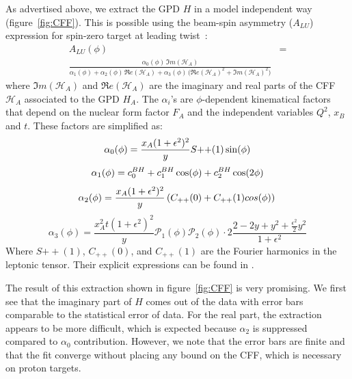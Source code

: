 \documentclass[%
 reprint,
 amsmath,amssymb,
 aps,
]{revtex4-1}
\begin{document}
As advertised above, we extract the GPD $H$ in a model independent way 
(figure~\ref{fig:CFF}). This is possible using the beam-spin asymmetry ($A_{LU}$) 
expression for spin-zero target at leading twist~\cite{BM_2009}:
\begin{equation}
\begin{split}
A_{LU}(\phi) &= \\
 \frac{\alpha_{0}(\phi) \, \Im m(\mathcal{H}_{A})}
{\alpha_{1}(\phi) + \alpha_{2}(\phi) \, \Re e(\mathcal{H}_{A}) + \alpha_{3}(\phi) \, 
\big( 
\Re e(\mathcal{H}_{A})^{2} + \Im m(\mathcal{H}_{A})^{2} \big)}
\label{eq:A_LU-coh}
\end{split}
\end{equation}
where $\Im m(\mathcal{H}_{A})$ and $\Re e(\mathcal{H}_{A})$ are the imaginary 
and real parts of the CFF $\mathcal{H}_{A}$ associated to the GPD $H_A$. The 
$\alpha_{i}$'s are $\phi$-dependent kinematical factors that depend on the 
nuclear form factor $F_A$ and the independent variables $Q^2$, $x_{B}$ and $t$.  
These factors are simplified as:
\begin{equation}
   \alpha_0 (\phi) =\frac{x_{A}(1+\epsilon^2)^2}{y} S{++}(1) \sin(\phi)\\
\end{equation}
\begin{equation}
    \alpha_1 (\phi) = c_0^{BH}+c_1^{BH} \cos({\phi})+c_2^{BH} \cos(2\phi)\\ 
\end{equation}
\begin{equation}
   \alpha_2 (\phi) = \frac{x_{A}(1+\epsilon^2)^2}{y}  \left( C_{++}(0) +  
C_{++}(1) cos(\phi) \right)\\
\end{equation}
\begin{equation}
\alpha_3 (\phi) = \frac{x^{2}_{A}t(1+\epsilon^2)^2}{y} {\mathcal P}_1(\phi) 
{\mathcal P}_2(\phi) \cdot 2 \frac{2-2y+y^2 + \frac{\epsilon^2}{2}y^2}{1 + 
\epsilon^2}
\end{equation}
Where $S{++}(1)$, $C_{++}(0)$, and $C_{++}(1)$ are the Fourier harmonics in the 
leptonic tensor. Their explicit expressions can be found in \cite{}.  

The result of this extraction shown in figure~\ref{fig:CFF} is very promising.
We first see that the imaginary part of $H$ comes out of the data with 
error bars comparable to the statistical error of data. For the real part,
the extraction appears to be more difficult, which is expected because 
$\alpha_2$ is suppressed compared to $\alpha_0$ contribution. However,
we note that the error bars are finite and that the fit converge without 
placing any bound on the CFF, which is necessary on proton targets.
\end{document}
